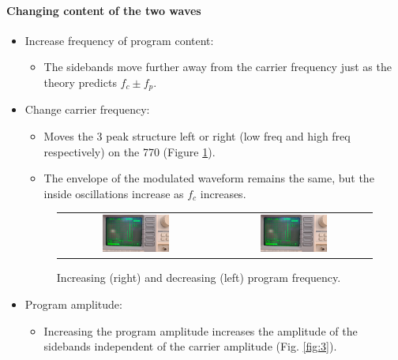 \documentclass[../main.tex]{subfiles}
\begin{document}
\paragraph*{Changing content of the two waves}
\begin{itemize}
    \item Increase frequency of program content:
    \begin{itemize}
        \item The sidebands move further away from the carrier frequency just as the theory predicts $f_c \pm f_p$.
    \end{itemize}
    \item Change carrier frequency:
    \begin{itemize}
        \item Moves the 3 peak structure left or right (low freq and high freq respectively) on the 770 (Figure \ref{fig:2}).
        \item The envelope of the modulated waveform remains the same, but the inside oscillations increase as $f_c$ increases.
    \end{itemize}
    \begin{figure}[ht]
        \centering
        \begin{tabular}{cc}
            \includegraphics[width=0.45\textwidth]{fig2_3.png} & \includegraphics[width=0.45\textwidth]{fig2_4.png}
        \end{tabular}
        \captionsetup{width=0.8\textwidth}
        \caption{Increasing (right) and decreasing (left) program frequency.}
        \label{fig:2}
    \end{figure}
    \item Program amplitude:
    \begin{itemize}
        \item Increasing the program amplitude increases the amplitude of the sidebands independent of the carrier amplitude (Fig. \ref{fig:3}).

\end{itemize}
\end{itemize}
\end{document}
